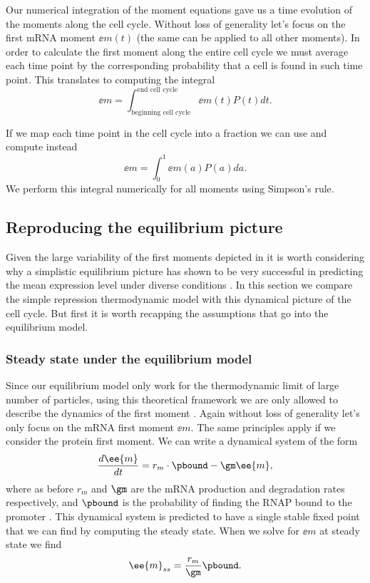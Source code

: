 Our numerical integration of the moment equations gave us a time evolution of
the moments along the cell cycle. Without loss of generality let's focus on the
first mRNA moment $\ee{m(t)}$ (the same can be applied to all other moments).
In order to calculate the first moment along the entire cell cycle we must
average each time point by the corresponding probability that a cell is found
in such time point. This translates to computing the integral
\begin{equation}
  \ee{m} = \int_{\text{beginning cell cycle}}^{\text{end cell cycle}}
                       \ee{m(t)} P(t) dt.
\end{equation}

If we map each time point in the cell cycle into a fraction we can use
 and compute instead
\begin{equation}
  \ee{m} = \int_0^1 \ee{m(a)} P(a) da.
  \label{eq_moment_avg}
\end{equation}
We perform this integral numerically for all moments using Simpson's rule.

\subsection{Reproducing the equilibrium picture}

Given the large variability of the first moments depicted in
 it is worth considering why a simplistic equilibrium
picture has shown to be very successful in predicting the mean expression level
under diverse conditions \cite{Garcia2011c, Brewster2014, Barnes2018,
Razo-Mejia2018}. In this section we compare the simple repression thermodynamic
model with this dynamical picture of the cell cycle. But first it is worth
recapping the assumptions that go into the equilibrium model.

\subsubsection{Steady state under the equilibrium model}

Since our equilibrium model only work for the thermodynamic limit of large
number of particles, using this theoretical framework we are only allowed to
describe the dynamics of the first moment \cite{Phillips2015}. Again without
loss of generality let's only focus on the mRNA first moment $\ee{m}$. The same
principles apply if we consider the protein first moment. We can write a
dynamical system of the form
\begin{equation}
  {d \ee{m} \over dt} = r_m \cdot \pbound - \gm \ee{m},
\end{equation}
where as before $r_m$ and $\gm$ are the mRNA production and degradation rates
respectively, and $\pbound$ is the probability of finding the RNAP
bound to the promoter \cite{Bintu2005a}. This dynamical system is predicted to
have a single stable fixed point that we can find by computing the steady state.
When we solve for $\ee{m}$ at steady state we find
\begin{equation}
  \ee{m}_{ss} = {r_m \over \gm} \pbound.
\end{equation}

